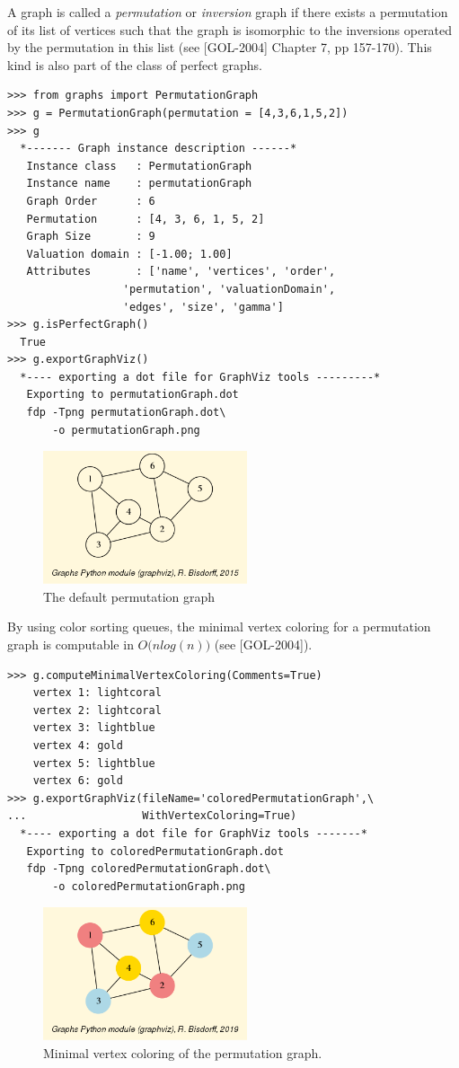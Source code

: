 A graph is called a \emph{permutation} or \emph{inversion} graph if there exists a permutation of its list of vertices such that the graph is isomorphic to the inversions operated by the permutation in this list (see [GOL-2004] Chapter 7, pp 157-170). This kind is also part of the class of perfect graphs.
\begin{lstlisting}
>>> from graphs import PermutationGraph
>>> g = PermutationGraph(permutation = [4,3,6,1,5,2])
>>> g
  *------- Graph instance description ------*
   Instance class   : PermutationGraph
   Instance name    : permutationGraph
   Graph Order      : 6
   Permutation      : [4, 3, 6, 1, 5, 2]
   Graph Size       : 9
   Valuation domain : [-1.00; 1.00]
   Attributes       : ['name', 'vertices', 'order',
                  'permutation', 'valuationDomain',
                  'edges', 'size', 'gamma']
>>> g.isPerfectGraph()
  True
>>> g.exportGraphViz()
  *---- exporting a dot file for GraphViz tools ---------*
   Exporting to permutationGraph.dot
   fdp -Tpng permutationGraph.dot\
       -o permutationGraph.png
\end{lstlisting}
\begin{figure}[h]
\sidecaption
\includegraphics[width=6cm]{Figures/permutationGraph.png}
\caption{The default \Digraph permutation graph} 
\label{fig:25.4}       %
\end{figure}

By using color sorting queues, the minimal vertex coloring for a permutation graph is computable in $O\big(n log(n)\big)$ (see [GOL-2004]).
\begin{lstlisting}
>>> g.computeMinimalVertexColoring(Comments=True)
    vertex 1: lightcoral
    vertex 2: lightcoral
    vertex 3: lightblue
    vertex 4: gold
    vertex 5: lightblue
    vertex 6: gold
>>> g.exportGraphViz(fileName='coloredPermutationGraph',\
...                  WithVertexColoring=True)
  *---- exporting a dot file for GraphViz tools -------*
   Exporting to coloredPermutationGraph.dot
   fdp -Tpng coloredPermutationGraph.dot\
       -o coloredPermutationGraph.png
\end{lstlisting}
\begin{figure}[h]
\sidecaption
\includegraphics[width=6cm]{Figures/coloredPermutationGraph.png}
\caption{Minimal vertex coloring of the permutation graph.} 
\label{fig:25.5}       %
\end{figure}

